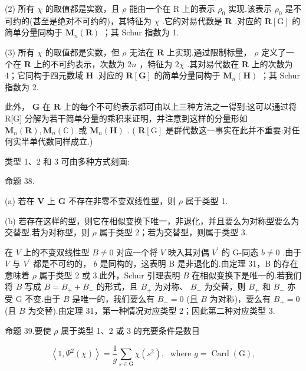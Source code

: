 \documentclass[10pt]{article}
\begin{document}
(2) 所有 \(\chi\) 的取值都是实数，且 \(\rho\) 能由一个在 R 上的表示 \({\rho }_{0}\) 实现.该表示 \({\rho }_{0}\) 是不可约的(甚至是绝对不可约的)，其特征为 \(\chi\) .它的对易代数是 \(\mathbf{R}\) .对应的 \(\mathbf{R}\left\lbrack  \mathrm{G}\right\rbrack\) 的简单分量同构于 \({\mathbf{M}}_{n}\left( \mathbf{R}\right)\) ；其 Schur 指数为 1.

(3) 所有 \(\chi\) 的取值都是实数，但 \(\rho\) 无法在 \(\mathbf{R}\) 上实现.通过限制标量， \(\rho\) 定义了一个在 \(\mathbf{R}\) 上的不可约表示，次数为 \({2n}\) ，特征为 \({2\chi }\) .其对易代数在 \(\mathbf{R}\) 上的次数为 4；它同构于四元数域 \(\mathbf{H}\) .对应的 \(\mathbf{R}\left\lbrack  \mathbf{G}\right\rbrack\) 的简单分量同构于 \({\mathbf{M}}_{n}\left( \mathbf{H}\right)\) ；其 Schur 指数为 2.

此外， \(\mathbf{G}\) 在 \(\mathbf{R}\) 上的每个不可约表示都可由以上三种方法之一得到:这可以通过将 R[G] 分解为若干简单分量的乘积来证明，并注意到这样的分量形如 \({\mathbf{M}}_{n}\left( \mathbf{R}\right) ,{\mathbf{M}}_{n}\left( \mathbb{C}\right)\) 或 \({\mathbf{M}}_{n}\left( \mathbf{H}\right)\) . ( \(\mathbf{R}\left\lbrack  \mathrm{G}\right\rbrack\) 是群代数这一事实在此并不重要:对任何实半单代数同样成立.)

类型 1、2 和 3 可由多种方式刻画:

命题 38.

(a) 若在 \(\mathbf{V}\) 上 \(\mathbf{G}\) 不存在非零不变双线性型，则 \(\rho\) 属于类型 1.

(b) 若存在这样的型，则它在相似变换下唯一，非退化，并且要么为对称型要么为交替型.若为对称型，则 \(\rho\) 属于类型 2；若为交替型，则属于类型 3.

在 \(V\) 上的不变双线性型 \(B \neq  0\) 对应一个将 \(V\) 映入其对偶 \({V}^{\prime }\) 的 G-同态 \(b \neq  0\) .由于 \(V\) 与 \({V}^{\prime }\) 都是不可约的， \(b\) 是同构的，这表明 B 是非退化的.由定理 31，B 的存在意味着 \(\rho\) 属于类型 2 或 3.此外，Schur 引理表明 \(B\) 在相似变换下是唯一的.若我们将 \(B\) 写成 \(B = {B}_{ + } + {B}_{ - }\) 的形式，且 \({B}_{ + }\) 为对称、 \({B}_{ - }\) 为交替，则 \({B}_{ + }\) 和 \({B}_{ - }\) 亦受 G 不变.由于 \(B\) 是唯一的，我们要么有 \({B}_{ - } = 0\) (且 \(B\) 为对称)，要么有 \({B}_{ + } = 0\) (且 \(B\) 为交替).由定理 31，第一种情况对应类型 2；因此第二种对应类型 3.

命题 39.要使 \(\rho\) 属于类型 1、2 或 3 的充要条件是数目

\[
\left\langle  {1,{\Psi }^{2}\left( \chi \right) }\right\rangle   = \frac{1}{g}\mathop{\sum }\limits_{{s \in  \mathrm{G}}}\chi \left( {s}^{2}\right) ,\;\text{ where }g = \operatorname{Card}\left( \mathrm{G}\right) ,
\]
\end{document}
